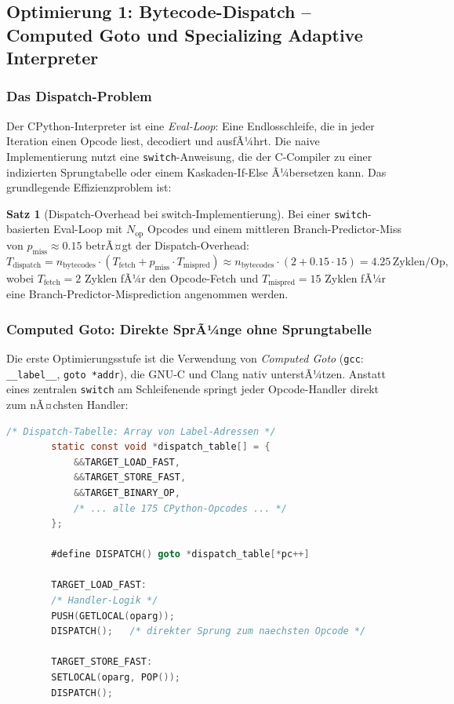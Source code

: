 ﻿\documentclass[a4paper,12pt]{scrreprt}
\theoremstyle{definition}
\newtheorem{satz}{Satz}[section]
\begin{document}
	\subsection{Optimierung 1: Bytecode-Dispatch -- Computed Goto und Specializing Adaptive Interpreter}
	
	\subsubsection{Das Dispatch-Problem}
	
	Der CPython-Interpreter ist eine \emph{Eval-Loop}: Eine Endlosschleife,
	die in jeder Iteration einen Opcode liest, decodiert und ausfÃ¼hrt.
	Die naive Implementierung nutzt eine \texttt{switch}-Anweisung, die der
	C-Compiler zu einer indizierten Sprungtabelle oder einem Kaskaden-If-Else
	Ã¼bersetzen kann. Das grundlegende Effizienzproblem ist:
	
	\begin{satz}[Dispatch-Overhead bei switch-Implementierung]
		\label{satz:switch_overhead}
		Bei einer \texttt{switch}-basierten Eval-Loop mit $N_{\mathrm{op}}$
		Opcodes und einem mittleren Branch-Predictor-Miss von
		$p_{\mathrm{miss}} \approx 0.15$ betrÃ¤gt der Dispatch-Overhead:
		\[
		T_{\mathrm{dispatch}} = n_{\mathrm{bytecodes}} \cdot
		\left(T_{\mathrm{fetch}} + p_{\mathrm{miss}} \cdot T_{\mathrm{mispred}}\right)
		\approx n_{\mathrm{bytecodes}} \cdot (2 + 0.15 \cdot 15) = 4.25\,\mathrm{Zyklen/Op},
		\]
		wobei $T_{\mathrm{fetch}} = 2$ Zyklen fÃ¼r den Opcode-Fetch und
		$T_{\mathrm{mispred}} = 15$ Zyklen fÃ¼r eine Branch-Predictor-Misprediction
		angenommen werden.
	\end{satz}
	
	\subsubsection{Computed Goto: Direkte SprÃ¼nge ohne Sprungtabelle}
	
	Die erste Optimierungsstufe ist die Verwendung von \emph{Computed Goto}
	(\texttt{gcc}: \texttt{\_\_label\_\_}, \texttt{goto *addr}), die
	GNU-C und Clang nativ unterstÃ¼tzen. Anstatt eines zentralen
	\texttt{switch} am Schleifenende springt jeder Opcode-Handler direkt
	zum nÃ¤chsten Handler:
	
	\begin{lstlisting}[language=C, caption={Computed-Goto Dispatch in CPython (vereinfacht)},
		label=lst:computed_goto]
		/* Dispatch-Tabelle: Array von Label-Adressen */
		static const void *dispatch_table[] = {
			&&TARGET_LOAD_FAST,
			&&TARGET_STORE_FAST,
			&&TARGET_BINARY_OP,
			/* ... alle 175 CPython-Opcodes ... */
		};
		
		#define DISPATCH() goto *dispatch_table[*pc++]
		
		TARGET_LOAD_FAST:
		/* Handler-Logik */
		PUSH(GETLOCAL(oparg));
		DISPATCH();   /* direkter Sprung zum naechsten Opcode */
		
		TARGET_STORE_FAST:
		SETLOCAL(oparg, POP());
		DISPATCH();
	\end{lstlisting}
	
\end{document}
